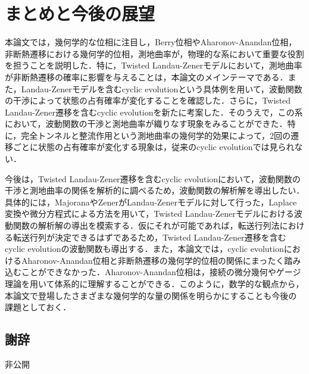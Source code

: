 \chapter{まとめと今後の展望}
本論文では，幾何学的な位相に注目し，Berry位相やAharonov-Anandan位相，非断熱遷移における幾何学的位相，測地曲率が，物理的な系において重要な役割を担うことを説明した．特に，Twisted Landau-Zenerモデルにおいて，測地曲率が非断熱遷移の確率に影響を与えることは，本論文のメインテーマである．また，Landau-Zenerモデルを含むcyclic evolutionという具体例を用いて，波動関数の干渉によって状態の占有確率が変化することを確認した．さらに，Twisted Landau-Zener遷移を含むcyclic evolutionを新たに考案した．そのうえで，この系において，波動関数の干渉と測地曲率が織りなす現象をみることができた．特に，完全トンネルと整流作用という測地曲率の幾何学的効果によって，2回の遷移ごとに状態の占有確率が変化する現象は，従来のcyclic evolutionでは見られない．


今後は，Twisted Landau-Zener遷移を含むcyclic evolutionにおいて，波動関数の干渉と測地曲率の関係を解析的に調べるため，波動関数の解析解を導出したい．具体的には，MajoranaやZenerがLandau-Zenerモデルに対して行った，Laplace変換や微分方程式による方法を用いて，Twisted Landau-Zenerモデルにおける波動関数の解析解の導出を模索する．仮にそれが可能であれば，転送行列法における転送行列が決定できるはずであるため，Twisted Landau-Zener遷移を含むcyclic evolutionの波動関数も導出する．また，本論文では，cyclic evolutionにおけるAharonov-Anandan位相と非断熱遷移の幾何学的位相の関係にまったく踏み込むことができなかった．Aharonov-Anandan位相は，接続の微分幾何やゲージ理論を用いて体系的に理解することができる．このように，数学的な観点から，本論文で登場したさまざまな幾何学的な量の関係を明らかにすることも今後の課題としておく．


\section*{謝辞}
非公開